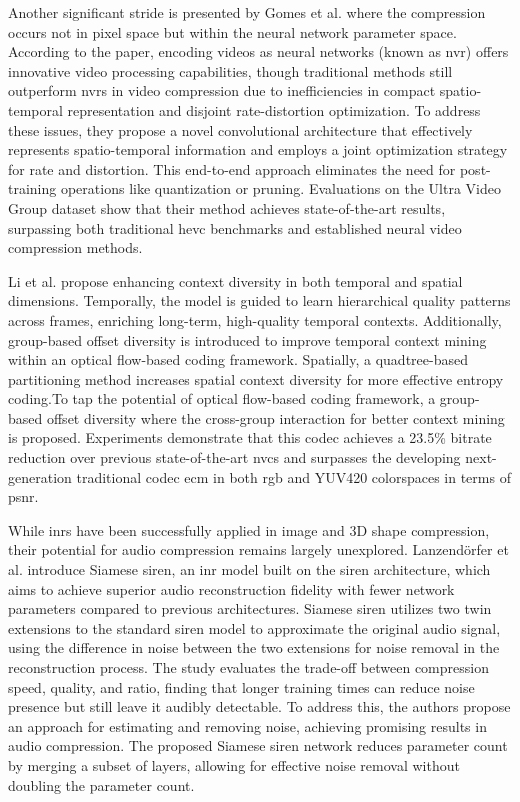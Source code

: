 Another significant stride is presented by Gomes et al. \cite{Gomes_2023_CVPR} where the compression occurs not in pixel space but within the neural network parameter space. According to the paper, encoding videos as neural networks (known as \gls{nvr}) offers innovative video processing capabilities, though traditional methods still outperform \gls{nvr}s in video compression due to inefficiencies in compact spatio-temporal representation and disjoint rate-distortion optimization. To address these issues, they propose a novel convolutional architecture that effectively represents spatio-temporal information and employs a joint optimization strategy for rate and distortion. This end-to-end approach eliminates the need for post-training operations like quantization or pruning. Evaluations on the Ultra Video Group dataset show that their method achieves state-of-the-art results, surpassing both traditional \gls{hevc} benchmarks and established neural video compression methods. 

Li et al.\cite{li2023neural} propose enhancing context diversity in both temporal and spatial dimensions. Temporally, the model is guided to learn hierarchical quality patterns across frames, enriching long-term, high-quality temporal contexts. Additionally, group-based offset diversity is introduced to improve temporal context mining within an optical flow-based coding framework. Spatially, a quadtree-based partitioning method increases spatial context diversity for more effective entropy coding.To tap the potential of optical flow-based coding framework, a group-based offset diversity where the cross-group interaction for better context mining is proposed. Experiments demonstrate that this \gls{codec} achieves a 23.5\% bitrate reduction over previous state-of-the-art \gls{nvc}s and surpasses the developing next-generation traditional \gls{codec} \gls{ecm} in both \gls{rgb} and YUV420 colorspaces in terms of \gls{psnr}. 

While \gls{inr}s have been successfully applied in image and 3D shape compression, their potential for audio compression remains largely unexplored. Lanzendörfer et al. \cite{lanzendörfer2023siamese} introduce Siamese \gls{siren}, an \gls{inr} model built on the \gls{siren} architecture, which aims to achieve superior audio reconstruction fidelity with fewer network parameters compared to previous architectures. Siamese \gls{siren} utilizes two twin extensions to the standard \gls{siren} model to approximate the original audio signal, using the difference in noise between the two extensions for noise removal in the reconstruction process. The study evaluates the trade-off between compression speed, quality, and ratio, finding that longer training times can reduce noise presence but still leave it audibly detectable. To address this, the authors propose an approach for estimating and removing noise, achieving promising results in audio compression. The proposed Siamese \gls{siren} network reduces parameter count by merging a subset of layers, allowing for effective noise removal without doubling the parameter count.

